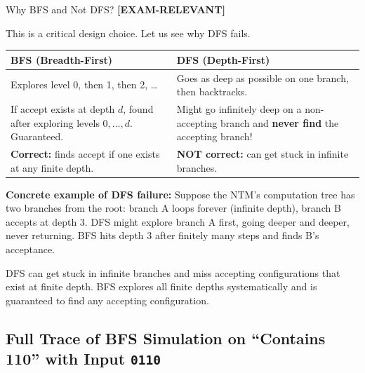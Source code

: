 \documentclass[11pt,a4paper]{article}
\newcommand{\kemark}{\textcolor{red!70!black}{\textbf{[EXAM-RELEVANT]}}}
\newcommand{\kt}[1]{\par\vspace{0.3em}\colorbox{yellow!60}{\parbox{\dimexpr\linewidth-2\fboxsep}{#1}}\vspace{0.3em}}
\begin{document}
\begin{conceptbox}{Why BFS and Not DFS? \kemark}

This is a critical design choice. Let us see why DFS fails.

\begin{center}
\begin{tabular}{p{5.5cm}p{5.5cm}}
\toprule
\textbf{BFS (Breadth-First)} & \textbf{DFS (Depth-First)} \\
\midrule
Explores level 0, then 1, then 2, \ldots & Goes as deep as possible on one branch, then backtracks. \\[0.5em]
If accept exists at depth $d$, found after exploring levels $0, \ldots, d$. Guaranteed. & Might go infinitely deep on a non-accepting branch and \textbf{never find} the accepting branch! \\[0.5em]
\textbf{Correct:} finds accept if one exists at any finite depth. & \textbf{NOT correct:} can get stuck in infinite branches. \\
\bottomrule
\end{tabular}
\end{center}

\textbf{Concrete example of DFS failure:} Suppose the NTM's computation tree has two branches from the root: branch A loops forever (infinite depth), branch B accepts at depth 3. DFS might explore branch A first, going deeper and deeper, never returning. BFS hits depth 3 after finitely many steps and finds B's acceptance.

\kt{DFS can get stuck in infinite branches and miss accepting configurations that exist at finite depth. BFS explores all finite depths systematically and is guaranteed to find any accepting configuration.}
\end{conceptbox}

\subsection{Full Trace of BFS Simulation on ``Contains 110'' with Input \texttt{0110}}
\end{document}
